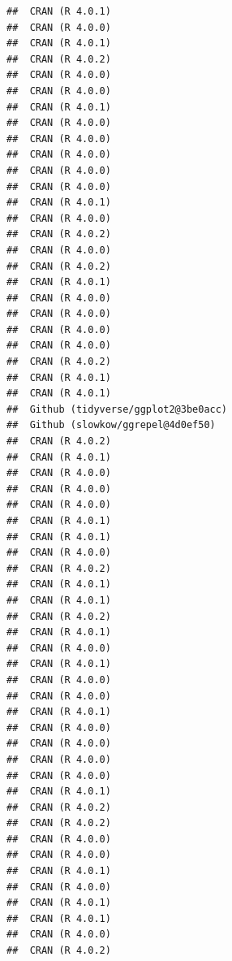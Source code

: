 \documentclass[
  french,
]{book}
\begin{document}
\begin{verbatim}
##  CRAN (R 4.0.1)                         
##  CRAN (R 4.0.0)                         
##  CRAN (R 4.0.1)                         
##  CRAN (R 4.0.2)                         
##  CRAN (R 4.0.0)                         
##  CRAN (R 4.0.0)                         
##  CRAN (R 4.0.1)                         
##  CRAN (R 4.0.0)                         
##  CRAN (R 4.0.0)                         
##  CRAN (R 4.0.0)                         
##  CRAN (R 4.0.0)                         
##  CRAN (R 4.0.0)                         
##  CRAN (R 4.0.1)                         
##  CRAN (R 4.0.0)                         
##  CRAN (R 4.0.2)                         
##  CRAN (R 4.0.0)                         
##  CRAN (R 4.0.2)                         
##  CRAN (R 4.0.1)                         
##  CRAN (R 4.0.0)                         
##  CRAN (R 4.0.0)                         
##  CRAN (R 4.0.0)                         
##  CRAN (R 4.0.0)                         
##  CRAN (R 4.0.2)                         
##  CRAN (R 4.0.1)                         
##  CRAN (R 4.0.1)                         
##  Github (tidyverse/ggplot2@3be0acc)     
##  Github (slowkow/ggrepel@4d0ef50)       
##  CRAN (R 4.0.2)                         
##  CRAN (R 4.0.1)                         
##  CRAN (R 4.0.0)                         
##  CRAN (R 4.0.0)                         
##  CRAN (R 4.0.0)                         
##  CRAN (R 4.0.1)                         
##  CRAN (R 4.0.1)                         
##  CRAN (R 4.0.0)                         
##  CRAN (R 4.0.2)                         
##  CRAN (R 4.0.1)                         
##  CRAN (R 4.0.1)                         
##  CRAN (R 4.0.2)                         
##  CRAN (R 4.0.1)                         
##  CRAN (R 4.0.0)                         
##  CRAN (R 4.0.1)                         
##  CRAN (R 4.0.0)                         
##  CRAN (R 4.0.0)                         
##  CRAN (R 4.0.1)                         
##  CRAN (R 4.0.0)                         
##  CRAN (R 4.0.0)                         
##  CRAN (R 4.0.0)                         
##  CRAN (R 4.0.0)                         
##  CRAN (R 4.0.1)                         
##  CRAN (R 4.0.2)                         
##  CRAN (R 4.0.2)                         
##  CRAN (R 4.0.0)                         
##  CRAN (R 4.0.0)                         
##  CRAN (R 4.0.1)                         
##  CRAN (R 4.0.0)                         
##  CRAN (R 4.0.1)                         
##  CRAN (R 4.0.1)                         
##  CRAN (R 4.0.0)                         
##  CRAN (R 4.0.2)                         

\end{verbatim}
\end{document}
